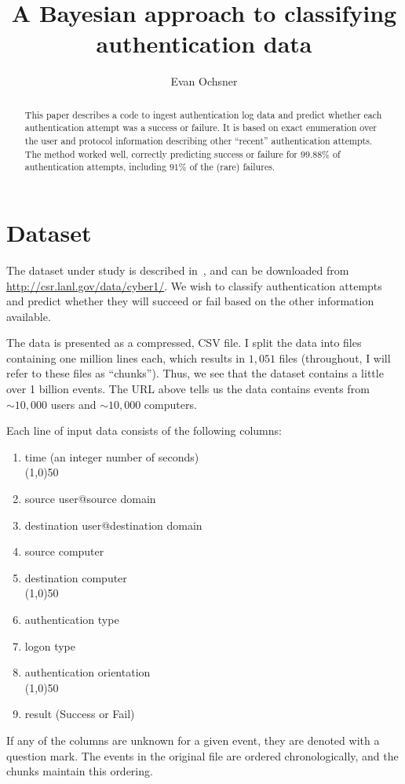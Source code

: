 \documentclass[aps, prd, amsmath, floats, floatfix, superscriptaddress,
nofootinbib,eqsecnum]{revtex4}
\begin{document}
\title{A Bayesian approach to classifying authentication data}

\author{Evan Ochsner}

\begin{abstract}
This paper describes a code to ingest authentication log data and predict whether
each authentication attempt was a success or failure. It is based on exact enumeration over the user
and protocol information describing other ``recent'' authentication attempts.
The method worked well, correctly
predicting success or failure for $99.88\%$ of authentication attempts, including $91\%$
of the (rare) failures.
\end{abstract}


\maketitle

\section{Dataset}
\label{sec:Data}

The dataset under study is described in~\cite{akent-2015-enterprise-data,kent-2015-cyberdata1},
and can be downloaded from \url{http://csr.lanl.gov/data/cyber1/}.
We wish to classify authentication attempts and predict whether they will succeed or fail
based on the other information available. 

The data is presented as a compressed, CSV file. I split the data into files containing
one million lines each, which results in $1,051$ files (throughout, I will refer to these files as ``chunks'').
Thus, we see that the dataset contains a little over 1 billion events.
The URL above tells us the data contains events from 
$\sim 10,000$ users and $\sim 10,000$ computers.

Each line of input data consists of the following columns:
\begin{enumerate}
	\item time (an integer number of seconds)\\
	\line(1,0){50}
	\item source user@source domain
	\item destination user@destination domain
	\item source computer
	\item destination computer\\
	\line(1,0){50}
	\item authentication type
	\item logon type
	\item authentication orientation\\
	\line(1,0){50}
	\item result (Success or Fail) 
\end{enumerate}
If any of the columns are unknown for a given event, they are denoted with a question mark.
The events in the original file are ordered chronologically, and the chunks maintain this ordering.
\end{document}
